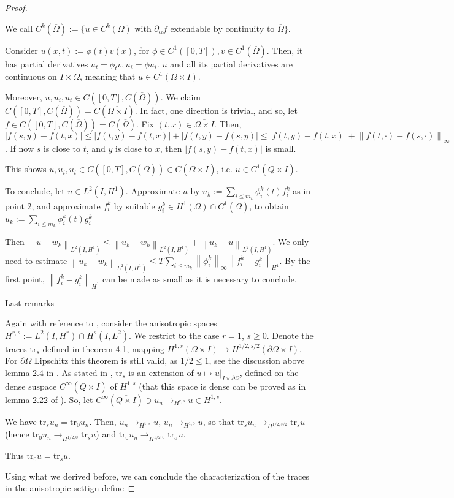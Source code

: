 \documentclass[english,a4paper,12pt,oneside]{scrbook}
\theoremstyle{break}
\newenvironment{mproof}[1][\proofname]{%
  \begin{proof}[#1]$ $\par\nobreak\ignorespaces
}{%
  \end{proof}
}
\renewcommand*{\proofname}{Proof}
\theoremstyle{remark}
\newcommand{\ds}{\displaystyle}
\newcommand{\norm}[1]{\left\lVert#1\right\rVert}
\newcommand{\tr}{\text{tr}}
\begin{document}
\begin{mproof}
We call $C^k(\overline{\Omega}):=\{u \in C^k(\Omega) \text{ with }\partial_\alpha f \text{ extendable by continuity to } \overline{\Omega} \}$. 

Consider $u(x,t):=\phi(t)v(x)$, for $\phi \in C^1([0,T]), v \in C^1(\overline{\Omega})$. Then, it has partial derivatives $u_t = \phi_t v, u_i = \phi u_i$. $u$ and all its partial derivatives are continuous on $I\times \Omega$, meaning that $u \in C^1(\Omega \times I)$.

Moreover, $u, u_i, u_t \in C([0,T], C(\overline{\Omega}))$. We claim $ C([0,T], C(\overline{\Omega})) = C(\overline{\Omega\times I})$. In fact, one direction is trivial, and so, let $f \in C([0,T], C(\overline{\Omega})) = C(\overline{\Omega})$. Fix $(t,x) \in \overline{\Omega\times I}$. Then, $|f(s,y)-f(t,x)|\leq |f(t,y)-f(t,x)|+|f(t,y)-f(s,y)|\leq  |f(t,y)-f(t,x)|+\norm{f(t, \cdot)-f(s,\cdot)}_{\infty}$. If now $s$ is close to $t$, and $y$ is close to $x$, then $|f(s,y)-f(t,x)|$ is small.

This shows $u, u_i, u_t \in C([0,T], C(\overline{\Omega})) \in C(\overline{\Omega\times I}) $, i.e. $u \in C^1(\overline{Q\times I})$.

To conclude, let $u \in L^2(I,H^1)$. Approximate $u$ by $u_k:=\sum_{i\leq m_k} \phi_i^k(t)f_i^k$ as in point 2, and approximate $f_i^k$ by suitable $g_i^k \in H^1(\Omega)\cap C^1(\overline{\Omega})$, to obtain $u_k:=\sum_{i\leq m_k} \phi_i^k(t)g_i^k$

Then $\norm{u-w_k}_{L^2(I,H^1)}\leq \norm{u_k-w_k}_{L^2(I,H^1)}+\norm{u_k-u}_{L^2(I,H^1)}$. We only need to estimate $ \norm{u_k-w_k}_{L^2(I,H^1)}\leq\ds  T \sum_{i\leq m_k} \norm{\phi_i^k}_\infty\norm{f_i^k-g_i^k}_{H^1}$. By the first point, $\norm{f_i^k-g_i^k}_{H^1}$ can be made as small as it is necessary to conclude.

\underline{Last remarks}

Again with reference to \cite{lions}, consider the anisotropic spaces $H^{r,s}:=L^2(I,H^r)\cap H^s(I,L^2)$. We restrict to the case $r = 1$, $s\geq 0$. Denote the traces $\tr_s$ defined in theorem 4.1, mapping $H^{1,s}(\Omega \times I)\rightarrow H^{1/2, s/2}(\partial \Omega \times I)$. For $\partial \Omega$ Lipschitz this theorem is still valid, as $1/2\leq 1$, see the discussion above lemma 2.4 in \cite{costabel}. As stated in \cite{lions}, $\tr_s$ is an extension of  $u\mapsto u|_{I\times \partial \Omega}$, defined on the dense suspace $C^\infty(\overline{Q\times I})$ of $H^{1,s}$ (that this space is dense can be proved as in lemma 2.22 of \cite{costabel}). So, let $C^\infty(\overline{Q\times I})\ni u_n \rightarrow_{H^{r,s}} u \in H^{1,s}$.
 
We have $\tr_s u_n = \tr_0 u_n$. Then, $u_n \rightarrow_{H^{1,s}} u$, $u_n \rightarrow_{H^{1,0}} u$, so that $\tr_s u_n \rightarrow_{H^{1/2,s/2}}\tr_s u$ (hence $\tr_0 u_n \rightarrow_{H^{1/2,0}}\tr_s u$) and $\tr_0 u_n  \rightarrow_{H^{1/2,0}} \tr_\sigma u$.

Thus $\tr_0 u = \tr_s u$.

Using what we derived before, we can conclude the characterization of the traces in the anisotropic settign define 

\end{mproof}
\end{document}
